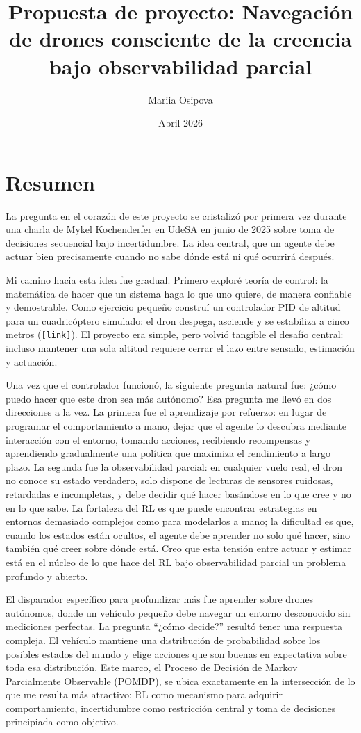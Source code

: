 \documentclass[11pt]{article}
\title{Propuesta de proyecto: Navegación de drones consciente de la creencia bajo observabilidad parcial}
\author{Mariia Osipova}
\date{Abril 2026}
\begin{document}
\maketitle
\thispagestyle{empty}

\section*{Resumen}

La pregunta en el corazón de este proyecto se cristalizó por primera vez durante una charla de Mykel Kochenderfer
en UdeSA en junio de 2025 sobre toma de decisiones secuencial bajo incertidumbre. La idea central,
que un agente debe actuar bien precisamente cuando no sabe dónde está ni qué ocurrirá después.

Mi camino hacia esta idea fue gradual. Primero exploré teoría de control:
la matemática de hacer que un sistema haga lo que uno quiere, de manera confiable y demostrable.
Como ejercicio pequeño construí un controlador PID de altitud para un cuadricóptero simulado:
el dron despega, asciende y se estabiliza a cinco metros (\texttt{[link]}).
El proyecto era simple, pero volvió tangible el desafío central:
incluso mantener una sola altitud requiere cerrar el lazo entre sensado, estimación y actuación.

Una vez que el controlador funcionó,
la siguiente pregunta natural fue: ¿cómo puedo hacer que este dron sea más autónomo?
Esa pregunta me llevó en dos direcciones a la vez. La primera fue el aprendizaje por refuerzo:
en lugar de programar el comportamiento a mano, dejar que el agente lo descubra mediante
interacción con el entorno, tomando acciones, recibiendo recompensas y aprendiendo gradualmente
una política que maximiza el rendimiento a largo plazo. La segunda fue la observabilidad parcial:
en cualquier vuelo real, el dron no conoce su estado verdadero, solo dispone de lecturas
de sensores ruidosas, retardadas e incompletas, y debe decidir qué hacer basándose en lo que cree y no en lo que sabe.
La fortaleza del RL es que puede encontrar estrategias en entornos demasiado complejos como para modelarlos a mano;
la dificultad es que, cuando los estados están ocultos, el agente debe aprender no solo qué hacer, sino también qué creer sobre dónde está.
Creo que esta tensión entre actuar y estimar está en el núcleo de lo que hace del RL bajo observabilidad parcial un problema profundo y abierto.

El disparador específico para profundizar más fue aprender sobre drones autónomos, donde un vehículo pequeño debe navegar
un entorno desconocido sin mediciones perfectas. La pregunta ``¿cómo decide?'' resultó tener una respuesta compleja.
El vehículo mantiene una distribución de probabilidad sobre los posibles estados del mundo y elige acciones que son
buenas en expectativa sobre toda esa distribución. Este marco,
el Proceso de Decisión de Markov Parcialmente Observable (POMDP),
se ubica exactamente en la intersección de lo que me resulta más atractivo:
RL como mecanismo para adquirir comportamiento, incertidumbre como restricción central y toma de
decisiones principiada como objetivo.
\end{document}
